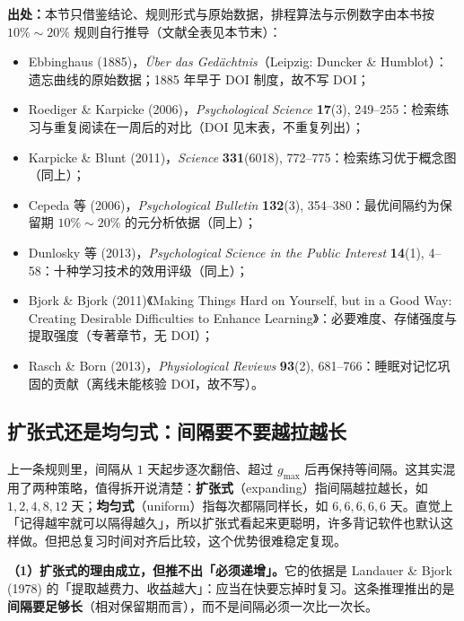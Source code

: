 {\footnotesize
\textbf{出处：}本节只借鉴结论、规则形式与原始数据，排程算法与示例数字由本书按 $10\%\sim20\%$ 规则自行推导（文献全表见本节末）：
}

\begin{itemize}[nosep,leftmargin=1.6em]
\item Ebbinghaus (1885)，\textit{Über das Gedächtnis}（Leipzig: Duncker \& Humblot）：遗忘曲线的原始数据；1885 年早于 DOI 制度，故不写 DOI；
\item Roediger \& Karpicke (2006)，\textit{Psychological Science} \textbf{17}(3), 249--255：检索练习与重复阅读在一周后的对比（DOI 见末表，不重复列出）；
\item Karpicke \& Blunt (2011)，\textit{Science} \textbf{331}(6018), 772--775：检索练习优于概念图（同上）；
\item Cepeda 等 (2006)，\textit{Psychological Bulletin} \textbf{132}(3), 354--380：最优间隔约为保留期 $10\%\sim20\%$ 的元分析依据（同上）；
\item Dunlosky 等 (2013)，\textit{Psychological Science in the Public Interest} \textbf{14}(1), 4--58：十种学习技术的效用评级（同上）；
\item Bjork \& Bjork (2011)《Making Things Hard on Yourself, but in a Good Way: Creating Desirable Difficulties to Enhance Learning》：必要难度、存储强度与提取强度（专著章节，无 DOI）；
\item Rasch \& Born (2013)，\textit{Physiological Reviews} \textbf{93}(2), 681--766：睡眠对记忆巩固的贡献（离线未能核验 DOI，故不写）。
\end{itemize}

\subsection{扩张式还是均匀式：间隔要不要越拉越长}
\label{subsec:app-i-expanding}

上一条规则里，间隔从 $1$ 天起步逐次翻倍、超过 $g_{\max}$ 后再保持等间隔。这其实混用了两种策略，值得拆开说清楚：\textbf{扩张式}（expanding）指间隔越拉越长，如 $1,2,4,8,12$ 天；\textbf{均匀式}（uniform）指每次都隔同样长，如 $6,6,6,6,6$ 天。直觉上「记得越牢就可以隔得越久」，所以扩张式看起来更聪明，许多背记软件也默认这样做。但把总复习时间对齐后比较，这个优势很难稳定复现。

\textbf{（1）扩张式的理由成立，但推不出「必须递增」。}它的依据是 Landauer \& Bjork (1978) 的「提取越费力、收益越大」：应当在快要忘掉时复习。这条推理推出的是\textbf{间隔要足够长}（相对保留期而言），而不是间隔必须一次比一次长。

